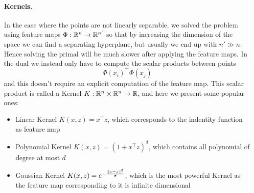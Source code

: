 \documentclass[answers]{exam}
\begin{document}
    \paragraph{Kernels.} In the case where the points are not linearly separable, we solved the problem using feature maps $\Phi:\mathbb{R}^n \to \mathbb{R}^{n'}$ so that by increasing the dimension of the space we can find a separating hyperplane, but usually we end up with $n' \gg n$. Hence solving the primal will be much slower after applying the feature maps. In the dual we instead only have to compute the scalar products between points
    $$ \Phi(x_i)^\top\Phi(x_j) $$
    and this doesn't require an explicit computation of the feature map. This scalar product is called a Kernel $K:\mathbb{R}^n\times \mathbb{R}^{n}\to \mathbb{R}$, and here we present some popular ones: 
    \begin{itemize}
        \item Linear Kernel $K(x,z) = x^\top z$, which corresponds to the indentity function as feature map 
        \item Polynomial Kernel $K(x,z) = (1 + x^\top z)^d$, which contains all polynomial of degree at most $d$
        \item Gaussian Kernel $K(x,z) = e^{-\frac{\left\lVert x-z \right\rVert^2}{\sigma}}$, which is the most powerful Kernel as the feature map corresponding to it is infinite dimensional
    \end{itemize}
\end{document}
